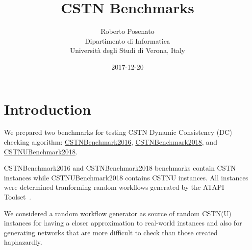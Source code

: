 \documentclass[a4paper,11pt]{article}
\begin{document}
\title{CSTN Benchmarks}
\author{Roberto Posenato\\
	Dipartimento di Informatica\\
	Università degli Studi di Verona, Italy}
\date{2017-12-20}

\ifpdf
\maketitle
\fi 

\section{Introduction}

We prepared two benchmarks for testing CSTN Dynamic Consistency (DC) checking algorithm: \href{http://profs.scienze.univr.it/~posenato/software/benchmarks/CSTNBenchmark2016.tgz}{CSTNBenchmark2016},
 \href{http://profs.scienze.univr.it/~posenato/software/benchmarks/CSTNBenchmark2018.tgz}{CSTNBenchmark2018}, and \href{http://profs.scienze.univr.it/~posenato/software/benchmarks/CSTNUBenchmark2018.tgz}{CSTNUBenchmark2018}.

CSTNBenchmark2016 and CSTNBenchmark2018 benchmarks contain CSTN instances while CSTNUBenchmark2018 contains CSTNU instances. 
All instances were determined tranforming random workflows generated by the ATAPI Toolset~\cite{Lanz14b}.

We considered a random workflow generator as source of random CSTN(U) instances for having a closer approximation to real-world instances and also for generating networks that are more difficult to check than those created haphazardly.
\end{document}
